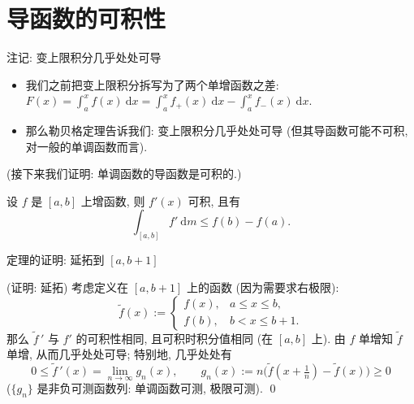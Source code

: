 
\section[导函数可积]{导函数的可积性}


\begin{frame}{注记: 变上限积分几乎处处可导}

\begin{itemize}
\item 我们之前把变上限积分拆写为了两个单增函数之差:
  $F(x) = \int_a^x f(x) ~ \mathrm{d} x = \int_a^x f_+(x) ~ \mathrm{d} x - \int_a^x f_-(x) ~ \mathrm{d} x$.
\item 那么勒贝格定理告诉我们: \alert{变上限积分几乎处处可导}
  (但其导函数可能不可积, 对一般的单调函数而言).
\end{itemize}

\pause

(接下来我们证明: 单调函数的导函数是可积的.)

\begin{thm}
设 $f$ 是 $[a, b]$ 上增函数, 则 $f'(x)$ 可积, 且有
\[
\int_{[a, b]} f' ~ \mathrm{d} m \leqslant f(b) - f(a) .
\]
\end{thm}

\end{frame}


\begin{frame}{定理的证明: 延拓到 $[a, b+1]$}

\startproof[bg=yellow, fg=red](证明: 延拓)
考虑定义在 $[a, b + 1]$ 上的函数 (因为需要求右极限):
\[
\widetilde{f}(x) :=
\begin{cases}
f(x), & a \leqslant x \leqslant b, \\
f(b), & b < x \leqslant b + 1 .
\end{cases}
\]
那么 $\widetilde{f}\,'$ 与 $f'$ 的可积性相同, 且可积时积分值相同 (在 $[a, b]$ 上).
由 $f$ 单增知 $\widetilde{f}$ 单增, 从而几乎处处可导; 特别地, 几乎处处有
\[
0 \leqslant \widetilde{f}\,'(x)
= \lim_{n \to \infty} g_n(x),
\qquad
g_n(x) := n \big( \widetilde{f}(x + \tfrac1n) - \widetilde{f}(x) \big) \geqslant 0
\]
($\{ g_n \}$ 是非负可测函数列: 单调函数可测, 极限可测).
\qed

\end{frame}


